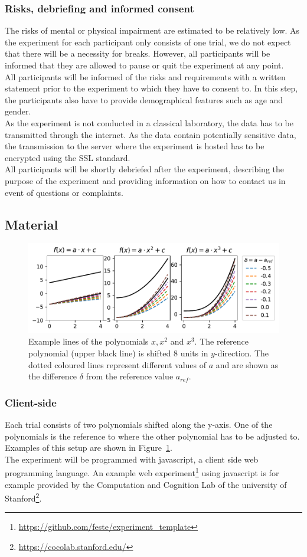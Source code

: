 \documentclass[a4paper, doc, draftall]{apa6}
\begin{document}
		\subsubsection{Risks, debriefing and informed consent}
			The risks of mental or physical impairment are estimated to be relatively low. As the experiment for each participant only consists of one trial, we do not expect that there will be a necessity for breaks. However, all participants will be informed that they are allowed to pause or quit the experiment at any point.\\
			All participants will be informed of the risks and requirements with a written statement prior to the experiment to which they have to consent to. In this step, the participants also have to provide demographical features such as age and gender.\\
			As the experiment is not conducted in a classical laboratory, the data has to be transmitted through the internet. As the data contain potentially sensitive data, the transmission to the server where the experiment is hosted has to be encrypted using the SSL standard.\\
			All participants will be shortly debriefed after the experiment, describing the purpose of the experiment and providing information on how to contact us in event of questions or complaints. 
	
	\subsection{Material}
	\begin{figure}[!t]
		\includegraphics[width=\textwidth]{plots/examples.pdf}
		\caption{Example lines of the polynomials $x, x^2$ and $x^3$. The reference polynomial (upper black line) is shifted 8 units in $y$-direction. The dotted coloured lines represent different values of $a$ and are shown as the difference $\delta$ from the reference value $a_{ref}$.}
		\label{examples}
	\end{figure}
	\subsubsection{Client-side}
	Each trial consists of two polynomials shifted along the y-axis. One of the polynomials is the reference to where the other polynomial has to be adjusted to. Examples of this setup are shown in Figure~\ref{examples}.\\
	The experiment will be programmed with javascript, a client side web programming language. An example web experiment\footnote{\url{https://github.com/feste/experiment_template}} using javascript is for example provided by the Computation and Cognition Lab of the university of Stanford\footnote{\url{https://cocolab.stanford.edu/}}.\\
\end{document}
